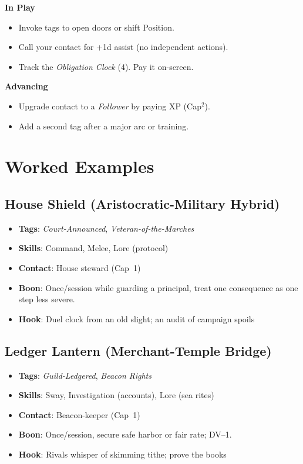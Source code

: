 \begin{multicols}{2}
\begin{tcolorbox}[colback=blue!5!white,colframe=blue!75!black,title=Background Quick Reference,fonttitle=\bfseries]
\textbf{In Play}
\begin{itemize}
\item Invoke tags to open doors or shift Position.
\item Call your contact for +1d assist (no independent actions).
\item Track the \emph{Obligation Clock} (4). Pay it on-screen.
\end{itemize}

\textbf{Advancing}
\begin{itemize}
\item Upgrade contact to a \emph{Follower} by paying XP (Cap$^2$).
\item Add a second tag after a major arc or training.
\end{itemize}
\end{tcolorbox}

\section{Worked Examples}

\subsection*{House Shield (Aristocratic-Military Hybrid)}
\begin{itemize}
\item \textbf{Tags}: \textit{Court-Announced}, \textit{Veteran-of-the-Marches}
\item \textbf{Skills}: Command, Melee, Lore (protocol)
\item \textbf{Contact}: House steward (Cap~1)
\item \textbf{Boon}: Once/session while guarding a principal, treat one consequence as one step less severe.
\item \textbf{Hook}: Duel clock from an old slight; an audit of campaign spoils
\end{itemize}

\subsection*{Ledger Lantern (Merchant-Temple Bridge)}
\begin{itemize}
\item \textbf{Tags}: \textit{Guild-Ledgered}, \textit{Beacon Rights}
\item \textbf{Skills}: Sway, Investigation (accounts), Lore (sea rites)
\item \textbf{Contact}: Beacon-keeper (Cap~1)
\item \textbf{Boon}: Once/session, secure safe harbor or fair rate; DV--1.
\item \textbf{Hook}: Rivals whisper of skimming tithe; prove the books
\end{itemize}


\end{multicols}

